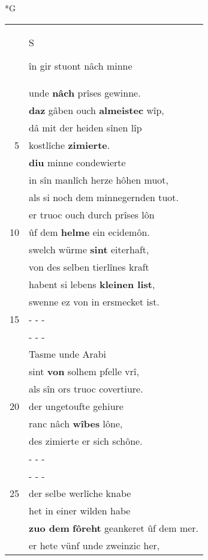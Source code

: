 \documentclass[8pt,a4paper,notitlepage]{article}
\begin{document}
\newpage
\begin{table}[ht]
\begin{minipage}[t]{0.5\linewidth}
\small
\begin{center}*G
\end{center}
\begin{tabular}{rl}
 & \begin{large}S\end{large}în gir stuont nâch minne\\ 
 & unde \textbf{nâch} prîses gewinne.\\ 
 & \textbf{daz} gâben ouch \textbf{almeistec} wîp,\\ 
 & dâ mit der heiden sînen lîp\\ 
5 & kostlîche \textbf{zimierte}.\\ 
 & \textbf{diu} minne condewierte\\ 
 & in sîn manlîch herze hôhen muot,\\ 
 & als si noch dem minnegernden tuot.\\ 
 & er truoc ouch durch prîses lôn\\ 
10 & ûf dem \textbf{helme} ein ecidemôn.\\ 
 & swelch würme \textbf{sint} eiterhaft,\\ 
 & von des selben tierlînes kraft\\ 
 & habent si lebens \textbf{kleinen list},\\ 
 & swenne ez von in ersmecket ist.\\ 
15 & \multicolumn{1}{l}{ - - - }\\ 
 & \multicolumn{1}{l}{ - - - }\\ 
 & Tasme unde Arabi\\ 
 & sint \textbf{von} solhem pfelle vrî,\\ 
 & als sîn ors truoc covertiure.\\ 
20 & der ungetoufte gehiure\\ 
 & ranc nâch \textbf{wîbes} lône,\\ 
 & des zimierte er sich schône.\\ 
 & \multicolumn{1}{l}{ - - - }\\ 
 & \multicolumn{1}{l}{ - - - }\\ 
25 & der selbe werlîche knabe\\ 
 & het in einer wilden habe\\ 
 & \textbf{zuo dem} \textbf{fôreht} geankeret ûf dem mer.\\ 
 & er hete vünf unde zweinzic her,\\ 

\end{tabular}
\end{minipage}
\end{table}
\end{document}
